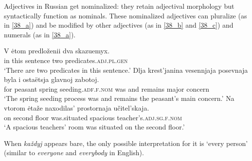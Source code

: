 \documentclass[output=paper]{langscibook}
\begin{document}

\ea\label{krasnyetufli} 
\z\ex\label{molodyjeljudi}
\z\z

\noindent Adjectives in Russian get nominalized: they retain adjectival morphology but syntactically function as nominals. These nominalized adjectives can pluralize (as in \ref{38_a}) and be modified by other adjectives (as in \ref{38_b} and \ref{38_c}) and numerals (as in \ref{38_a}).


\ea\label{38_a}
    \ea \gll V ėtom predloženii dva skazuemyx.\\
    in this sentence two predicates.\textsc{adj.pl.gen}\\
    \glt `There are two predicates in this sentence.'
    \ex\label{38_b} \gll Dlja krest'janina vesennjaja posevnaja byla i ostaëtsja glavnoj zabotoj.\\
    for peasant spring seeding.\textsc{adf.f.nom} was and remains major concern\\
    \glt `The spring seeding process was and remains the peasant's main concern.'
    \ex\label{38_c} \gll Na vtorom ėtaže naxodilas' prostornaja učitel'skaja.\\
    on second floor {was.situated} spacious teacher's.\textsc{adj.sg.f.nom}\\
    \glt `A spacious teachers' room was situated on the second floor.'
\z\z 

\noindent When \textit{každyj} appears bare, the only possible interpretation for it is `every person' (similar to \textit{everyone} and \textit{everybody} in English). 
\end{document}
